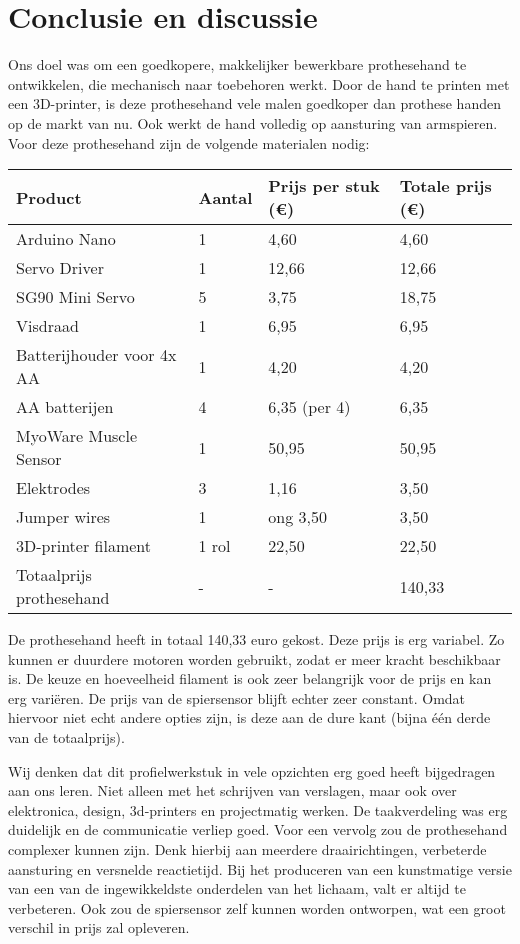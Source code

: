 \hypertarget{conclusie-en-discussie}{%
\section{Conclusie en discussie}\label{conclusie-en-discussie}}

Ons doel was om een goedkopere, makkelijker bewerkbare prothesehand te
ontwikkelen, die mechanisch naar toebehoren werkt. Door de hand te
printen met een 3D-printer, is deze prothesehand vele malen goedkoper
dan prothese handen op de markt van nu. Ook werkt de hand volledig op
aansturing van armspieren. Voor deze prothesehand zijn de volgende
materialen nodig:

\begin{longtable}[]{@{}llll@{}}
\toprule
Product & Aantal & Prijs per stuk (€) & Totale prijs (€)\tabularnewline
\midrule
\endhead
Arduino Nano & 1 & 4,60 & 4,60\tabularnewline
Servo Driver & 1 & 12,66 & 12,66\tabularnewline
SG90 Mini Servo & 5 & 3,75 & 18,75\tabularnewline
Visdraad & 1 & 6,95 & 6,95\tabularnewline
Batterijhouder voor 4x AA & 1 & 4,20 & 4,20\tabularnewline
AA batterijen & 4 & 6,35 (per 4) & 6,35\tabularnewline
MyoWare Muscle Sensor & 1 & 50,95 & 50,95\tabularnewline
Elektrodes & 3 & 1,16 & 3,50\tabularnewline
Jumper wires & 1 & ong 3,50 & 3,50\tabularnewline
3D-printer filament & 1 rol & 22,50 & 22,50\tabularnewline
Totaalprijs prothesehand & - & - & 140,33\tabularnewline
\bottomrule
\end{longtable}

De prothesehand heeft in totaal 140,33 euro gekost. Deze prijs is erg
variabel. Zo kunnen er duurdere motoren worden gebruikt, zodat er meer
kracht beschikbaar is. De keuze en hoeveelheid filament is ook zeer
belangrijk voor de prijs en kan erg variëren. De prijs van de
spiersensor blijft echter zeer constant. Omdat hiervoor niet echt andere
opties zijn, is deze aan de dure kant (bijna één derde van de
totaalprijs).

Wij denken dat dit profielwerkstuk in vele opzichten erg goed heeft
bijgedragen aan ons leren. Niet alleen met het schrijven van verslagen,
maar ook over elektronica, design, 3d-printers en projectmatig werken.
De taakverdeling was erg duidelijk en de communicatie verliep goed. Voor
een vervolg zou de prothesehand complexer kunnen zijn. Denk hierbij aan
meerdere draairichtingen, verbeterde aansturing en versnelde
reactietijd. Bij het produceren van een kunstmatige versie van een van
de ingewikkeldste onderdelen van het lichaam, valt er altijd te
verbeteren. Ook zou de spiersensor zelf kunnen worden ontworpen, wat een
groot verschil in prijs zal opleveren.
